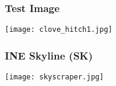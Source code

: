 
\begin{frame}\frametitle{Test Image} 
\texttt{[image: clove\_hitch1.jpg]}
\end{frame}

\begin{frame} \frametitle{INE Skyline (SK)} 
  \texttt{[image: skyscraper.jpg]}
\end{frame}
